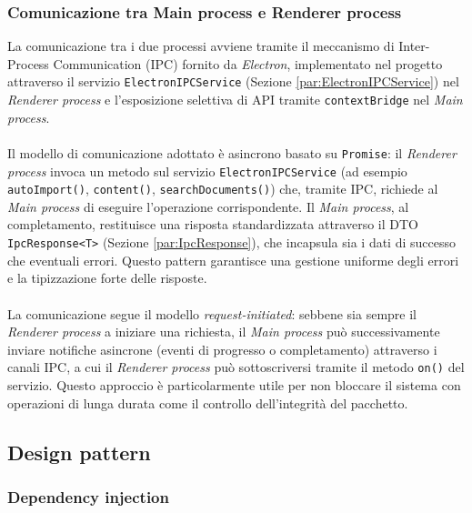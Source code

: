 \documentclass[a4paper,12pt]{article}
\begin{document}
{{            \subsubsection{Comunicazione tra Main process e Renderer process}\label{sec:ipc-communication} {
                La comunicazione tra i due processi avviene tramite il meccanismo di Inter-Process Communication (IPC) fornito da \textit{Electron}, implementato nel progetto attraverso il servizio \texttt{ElectronIPCService} (Sezione \ref{par:ElectronIPCService}) nel \textit{Renderer process} e l'esposizione selettiva di API tramite \texttt{contextBridge} nel \textit{Main process}.\\
                \\
                Il modello di comunicazione adottato è asincrono basato su \texttt{Promise}: il \textit{Renderer process} invoca un metodo sul servizio \texttt{ElectronIPCService} (ad esempio \texttt{autoImport()}, \texttt{content()}, \texttt{searchDocuments()}) che, tramite IPC, richiede al \textit{Main process} di eseguire l'operazione corrispondente. Il \textit{Main process}, al completamento, restituisce una risposta standardizzata attraverso il DTO \texttt{IpcResponse<T>} (Sezione \ref{par:IpcResponse}), che incapsula sia i dati di successo che eventuali errori. Questo pattern garantisce una gestione uniforme degli errori e la tipizzazione forte delle risposte.\\
                \\
                La comunicazione segue il modello \textit{request-initiated}: sebbene sia sempre il \textit{Renderer process} a iniziare una richiesta, il \textit{Main process} può successivamente inviare notifiche asincrone (eventi di progresso o completamento) attraverso i canali IPC, a cui il \textit{Renderer process} può sottoscriversi tramite il metodo \texttt{on()} del servizio. Questo approccio è particolarmente utile per non bloccare il sistema con operazioni di lunga durata come il controllo dell'integrità del pacchetto.
            }
        }
        \subsection{Design pattern} {
            \subsubsection{Dependency injection} {
}}}
\end{document}
